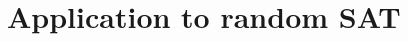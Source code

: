 \documentclass[12pt,notitlepage,a4paper]{article}
\newtheorem{lemma}{Lemma}[section]
\theoremstyle{definition}
\newcommand{\N}{\mathbb{N}}
\newcommand{\overbar}[1]{\mkern 1.5mu\overline{\mkern-1.5mu#1\mkern-1.5mu}\mkern 1.5mu}
\begin{document}
\section{Application to random SAT}





%
%
%	



 
 
\end{document}
